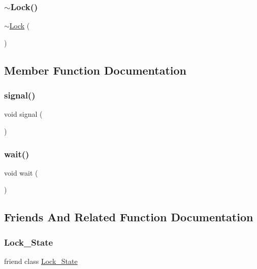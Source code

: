 \subsubsection{\texorpdfstring{$\sim$\+Lock()}{~Lock()}}
{\footnotesize\ttfamily $\sim$\mbox{\hyperlink{classLock}{Lock}} (\begin{DoxyParamCaption}{ }\end{DoxyParamCaption})}



\subsection{Member Function Documentation}
\mbox{\label{classLock_a2a0f4bfac2f24aa0a07de86141381aec}} 
\subsubsection{\texorpdfstring{signal()}{signal()}}
{\footnotesize\ttfamily void signal (\begin{DoxyParamCaption}{ }\end{DoxyParamCaption})}

\mbox{\label{classLock_aa3b21853f890838c88d047d6c2786917}} 
\subsubsection{\texorpdfstring{wait()}{wait()}}
{\footnotesize\ttfamily void wait (\begin{DoxyParamCaption}{ }\end{DoxyParamCaption})}



\subsection{Friends And Related Function Documentation}
\mbox{\label{classLock_aa4cd56dd42d22d72b90cadc832e52591}} 
\subsubsection{\texorpdfstring{Lock\+\_\+\+State}{Lock\_State}}
{\footnotesize\ttfamily friend class \mbox{\hyperlink{classLock__State}{Lock\+\_\+\+State}}\hspace{0.3cm}{\ttfamily [friend]}}

